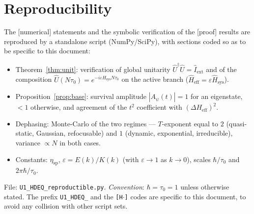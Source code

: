 \documentclass[11pt,a4paper]{article}
\newcommand{\Hsysop}{\hat{H}_{\mathrm{sys}}}
\newcommand{\Heff}{\hat{H}_{\mathrm{eff}}}
\newcommand{\Iext}{\hat{I}_{\mathrm{ext}}}
\newcommand{\statut}[1]{{\footnotesize\textsf{[#1]}}}
\theoremstyle{plain}
\theoremstyle{definition}
\theoremstyle{remark}
\begin{document}
\section*{Reproducibility}
The \statut{numerical} statements and the symbolic verification of the
\statut{proof} results are reproduced by a standalone script (NumPy/SciPy), with
sections coded so as to be specific to this document:
\begin{itemize}
\item[{\texttt{[H1]}}] Theorem~\ref{thm:unit}: verification of global unitarity $\hat U^\dagger\hat U=\Iext$ and of the composition $\hat U(N\tau_0)=e^{-i\varepsilon\Hsysop N\tau_0}$ on the active branch ($\Heff=\varepsilon\Hsysop$).
\item[{\texttt{[H2]}}] Proposition~\ref{prop:base}: survival amplitude $|A_\psi(t)|=1$ for an eigenstate, $<1$ otherwise, and agreement of the $t^2$ coefficient with $(\Delta H_{\mathrm{eff}})^2$.
\item[{\texttt{[H3]}}] Dephasing: Monte-Carlo of the two regimes --- $T$-exponent equal to $2$ (quasi-static, Gaussian, refocusable) and $1$ (dynamic, exponential, irreducible), variance $\propto N$ in both cases.
\item[{\texttt{[H4]}}] Constants: $\eta_{\mathrm{sp}}$, $\varepsilon=E(k)/K(k)$ (with $\varepsilon\to1$ as $k\to0$), scales $\hbar/\tau_0$ and $2\pi\hbar/\tau_0$.
\end{itemize}
File: \texttt{U1\_HDEQ\_reproductible.py}. \emph{Convention}: $\hbar=\tau_0=1$ unless
otherwise stated. The prefix \texttt{U1\_HDEQ\_} and the \texttt{[H$\cdot$]} codes are
specific to this document, to avoid any collision with other script sets.
\end{document}
